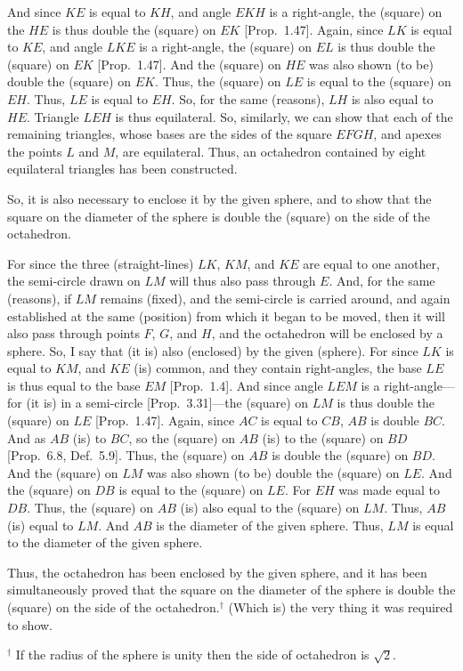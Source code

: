 \begin{Parallel}{}{}
{And since  $KE$ is equal to $KH$, and angle $EKH$ is a right-angle, 
the (square) on the  $HE$ is thus double the (square) on $EK$ [Prop.~1.47].
Again, since $LK$ is equal to $KE$, and angle $LKE$
is a right-angle, the (square) on $EL$ is thus double the (square) on
$EK$ [Prop.~1.47]. And the (square) on $HE$ was also shown (to be)
double the (square) on $EK$.  Thus, the (square) on $LE$
is equal to the (square) on $EH$. Thus, $LE$ is equal to $EH$. So,
for the same (reasons), $LH$ is also equal to $HE$. Triangle
$LEH$ is thus equilateral. So, similarly, we can show that each of
the remaining triangles, whose bases are the sides of the
square $EFGH$, and apexes the points $L$ and $M$, are equilateral.
Thus, an octahedron contained by eight
equilateral triangles has been constructed.

So, it is also necessary to enclose it by the given sphere, and to show that the
square on the diameter of the sphere is double the (square) on the
side of the octahedron.

For since the three (straight-lines) $LK$, $KM$, and $KE$ are equal
to one another, the semi-circle drawn on $LM$ will thus also pass
through $E$. And, for the same (reasons), if $LM$ remains (fixed), and the semi-circle is carried around, and again established at the same
(position) from which it began to be moved, then it will also pass
through points $F$, $G$, and $H$, and the octahedron will be
enclosed by a sphere. So, I say that (it is) also (enclosed)
by the given (sphere). For since $LK$ is equal to $KM$, and $KE$
(is) common, and they contain right-angles, the base
$LE$ is thus equal to the base $EM$ [Prop.~1.4]. And since angle $LEM$
is a right-angle---for (it is) in a semi-circle [Prop.~3.31]---the
(square) on $LM$ is thus double the (square) on $LE$ [Prop.~1.47]. 
Again, since $AC$ is equal to $CB$, $AB$ is double $BC$. 
And as $AB$ (is) to $BC$, so the (square) on $AB$ (is) to the
(square) on $BD$ [Prop.~6.8, Def.~5.9]. Thus, the (square) on 
$AB$ is double the (square) on $BD$. And the (square) on $LM$
was also shown (to be) double the (square) on $LE$. And the (square)
on $DB$ is equal to the (square) on $LE$. For $EH$ was made equal
to $DB$. Thus, the (square) on $AB$ (is) also equal to the (square) on 
$LM$. Thus, $AB$ (is) equal to $LM$. And $AB$ is the diameter of the
given sphere. Thus, $LM$ is equal to the diameter of the given sphere.

Thus, the octahedron has been enclosed by the given sphere,  and it has
been simultaneously  proved that the square on the diameter of the sphere
is double the (square) on the side of the octahedron.$^\dag$ (Which is) the
very thing it was required to show.}
\end{Parallel}
{\footnotesize\noindent$^\dag$ If the radius of the sphere is unity then the
side of octahedron is $\sqrt{2}$.}

